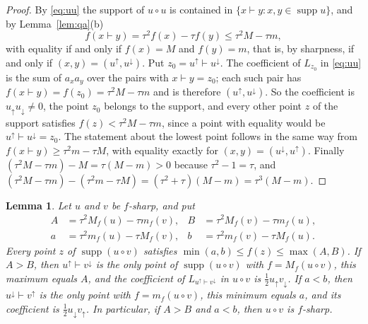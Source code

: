 \documentclass[11pt]{amsart}
\newtheorem{lemma}[theorem]{Lemma}
\theoremstyle{definition}
\theoremstyle{remark}
\newcommand{\qa}{\vdash}
\newcommand{\supp}{\operatorname{supp}}
\newcommand{\up}{{\uparrow}}
\newcommand{\dn}{{\downarrow}}
\begin{document}
\begin{proof}
By \eqref{eq:uu} the support of $u\circ u$ is contained in $\{x\qa y:x,y\in\supp u\}$, and by Lemma~\ref{lem:qa}(b)
\[
f(x\qa y)=\tau^2f(x)-\tau f(y)\le\tau^2M-\tau m,
\]
with equality if and only if $f(x)=M$ and $f(y)=m$, that is, by sharpness, if and only if $(x,y)=(u^\up,u^\dn)$. Put $z_0=u^\up\qa u^\dn$. The coefficient of $L_{z_0}$ in \eqref{eq:uu} is the sum of $a_xa_y$ over the pairs with $x\qa y=z_0$; each such pair has $f(x\qa y)=f(z_0)=\tau^2M-\tau m$ and is therefore $(u^\up,u^\dn)$. So the coefficient is $u_\up u_\dn\neq0$, the point $z_0$ belongs to the support, and every other point $z$ of the support satisfies $f(z)<\tau^2M-\tau m$, since a point with equality would be $u^\up\qa u^\dn=z_0$. The statement about the lowest point follows in the same way from $f(x\qa y)\ge\tau^2m-\tau M$, with equality exactly for $(x,y)=(u^\dn,u^\up)$. Finally $(\tau^2M-\tau m)-M=\tau(M-m)>0$ because $\tau^2-1=\tau$, and $(\tau^2M-\tau m)-(\tau^2m-\tau M)=(\tau^2+\tau)(M-m)=\tau^3(M-m)$.
\end{proof}

\begin{lemma}\label{lem:product}
Let $u$ and $v$ be $f$-sharp, and put
\begin{align*}
A&=\tau^2M_f(u)-\tau m_f(v), & B&=\tau^2M_f(v)-\tau m_f(u),\\
a&=\tau^2m_f(u)-\tau M_f(v), & b&=\tau^2m_f(v)-\tau M_f(u).
\end{align*}
Every point $z$ of $\supp(u\circ v)$ satisfies $\min(a,b)\le f(z)\le\max(A,B)$. If $A>B$, then $u^\up\qa v^\dn$ is the only point of $\supp(u\circ v)$ with $f=M_f(u\circ v)$, this maximum equals $A$, and the coefficient of $L_{u^\up\qa v^\dn}$ in $u\circ v$ is $\frac12u_\up v_\dn$. If $a<b$, then $u^\dn\qa v^\up$ is the only point with $f=m_f(u\circ v)$, this minimum equals $a$, and its coefficient is $\frac12u_\dn v_\up$. In particular, if $A>B$ and $a<b$, then $u\circ v$ is $f$-sharp.
\end{lemma}
\end{document}
